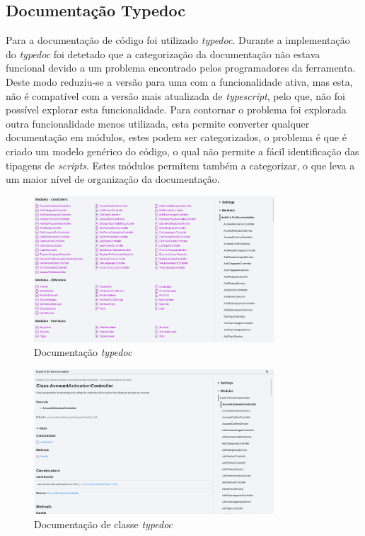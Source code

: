 \subsection{Documentação Typedoc}
Para a documentação de código foi utilizado \textit{typedoc}. Durante a implementação do \textit{typedoc} foi detetado que a categorização da documentação não estava funcional devido a um problema encontrado pelos programadores da ferramenta. Deste modo reduziu-se a versão para uma com a funcionalidade ativa, mas esta, não é compatível com a versão mais atualizada de \textit{typescript}, pelo que, não foi possível explorar esta funcionalidade. Para contornar o problema foi explorada outra funcionalidade menos utilizada, esta permite converter qualquer documentação em módulos, estes podem ser categorizados, o problema é que é criado um modelo genérico do código, o qual não permite a fácil identificação das tipagens de \textit{scripts}. Estes módulos permitem também a categorizar, o que leva a um maior nível de organização da documentação.

\begin{figure}[htb]
 \centering
 \includegraphics[width=0.8\textwidth]{images/implementacao/api/docs.png}
 \caption{Documentação \textit{typedoc}}
 \label{type_doc}
\end{figure}

\begin{figure}[htb]
 \centering
 \includegraphics[width=0.8\textwidth]{images/implementacao/api/docs_det.png}
 \caption{Documentação de classe \textit{typedoc}}
 \label{type_doc_det}
\end{figure}

